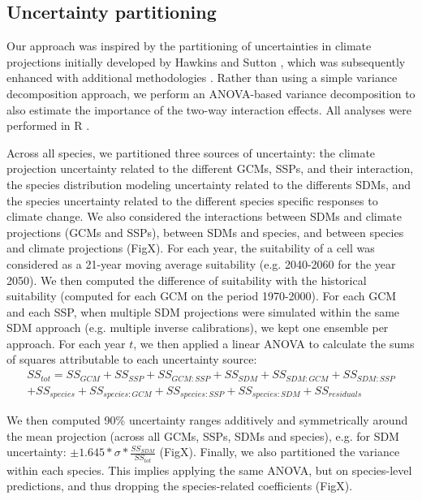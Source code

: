 \documentclass[letterpaper,8pt]{extarticle}  %
\begin{document}
\begin{doublespacing}
\begin{linenumbers}
\subsection{Uncertainty partitioning}

Our approach was inspired by the partitioning of uncertainties in climate projections initially developed by Hawkins and Sutton \citep{Hawkins2009, Hawkins2011}, which was subsequently enhanced with additional methodologies \citep[e.g.][]{Yip2011, Lafferty2023}. 
Rather than using a simple variance decomposition approach, we perform an ANOVA-based variance decomposition to also estimate the importance of the two-way interaction effects. All analyses were performed in R \citep{RCT2024}.

Across all species, we partitioned three sources of uncertainty: the climate projection uncertainty related to the different GCMs, SSPs, and their interaction, the species distribution modeling uncertainty related to the differents SDMs, and the species uncertainty related to the different species specific responses to climate change. We also considered the interactions between SDMs and climate projections (GCMs and SSPs), between SDMs and species, and between species and climate projections (FigX). For each year, the suitability of a cell was considered as a 21-year moving average suitability (e.g. 2040-2060 for the year 2050). We then computed the difference of suitability with the historical suitability (computed for each GCM on the period 1970-2000). For each GCM and each SSP, when multiple SDM projections were simulated within the same SDM approach (e.g. multiple inverse calibrations), we kept one ensemble per approach. For each year $t$, we then applied a linear ANOVA to calculate the sums of squares attributable to each uncertainty source:
\begin{multline*}
{SS}_{tot} = {SS}_{GCM} + {SS}_{SSP} + {SS}_{GCM:SSP} + {SS}_{SDM} + {SS}_{SDM:GCM} + {SS}_{SDM:SSP}\\+ {SS}_{species} + {SS}_{species:GCM} + {SS}_{species:SSP} + {SS}_{species:SDM} + {SS}_{residuals}
\end{multline*}

We then computed 90\% uncertainty ranges additively and symmetrically around the mean projection (across all GCMs, SSPs, SDMs and species), e.g. for SDM uncertainty: $\pm1.645*\sigma*\frac{{SS}_{SDM}}{{SS}_{tot}}$ (FigX).
Finally, we also partitioned the variance within each species. This implies applying the same ANOVA, but on species-level predictions, and thus dropping the species-related coefficients (FigX).


\end{linenumbers}
\end{doublespacing}
\end{document}

